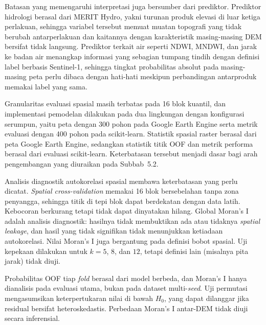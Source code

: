 \documentclass[12pt,a4paper]{article}
\newcommand{\FloatBarrier}{\clearpage}
\begin{document}
\enlargethispage{\baselineskip}Batasan yang memengaruhi interpretasi juga bersumber dari prediktor. Prediktor
hidrologi berasal dari MERIT Hydro, yakni turunan produk elevasi di luar
ketiga perlakuan, sehingga variabel tersebut memuat muatan topografi yang
tidak berubah antarperlakuan dan kaitannya dengan karakteristik masing-masing
DEM bersifat tidak langsung. Prediktor terkait air seperti NDWI, MNDWI, dan
jarak ke badan air menangkap informasi yang sebagian tumpang tindih dengan
definisi label berbasis Sentinel-1, sehingga tingkat probabilitas absolut
pada masing-masing peta perlu dibaca dengan hati-hati meskipun perbandingan
antarproduk memakai label yang sama.

Granularitas evaluasi spasial masih terbatas pada 16 blok kuantil, dan
implementasi pemodelan dilakukan pada dua lingkungan dengan konfigurasi
serumpun, yaitu peta dengan 300 pohon pada Google Earth Engine serta metrik
evaluasi dengan 400 pohon pada scikit-learn. Statistik spasial raster
berasal dari peta Google Earth Engine, sedangkan statistik titik OOF dan
metrik performa berasal dari evaluasi scikit-learn. Keterbatasan tersebut
menjadi dasar bagi arah pengembangan yang
diuraikan pada Subbab~5.2.

Analisis diagnostik autokorelasi spasial membawa keterbatasan yang
perlu dicatat. \textit{Spatial cross-validation} memakai 16 blok bersebelahan
tanpa zona penyangga, sehingga titik di tepi blok dapat berdekatan dengan
data latih. Kebocoran berkurang tetapi tidak dapat dinyatakan hilang. Global
Moran's I adalah analisis diagnostik: hasilnya tidak membuktikan ada atau
tidaknya \textit{spatial leakage}, dan hasil yang tidak signifikan tidak
menunjukkan ketiadaan autokorelasi. Nilai Moran's I juga bergantung pada
definisi bobot spasial. Uji kepekaan dilakukan untuk $k=5$, $8$, dan $12$,
tetapi definisi lain (misalnya pita jarak) tidak diuji.

Probabilitas OOF tiap \textit{fold} berasal dari model berbeda, dan Moran's I
hanya dianalisis pada evaluasi utama, bukan pada dataset multi-\textit{seed}.
Uji permutasi mengasumsikan keterpertukaran nilai di bawah $H_0$, yang dapat
dilanggar jika residual bersifat heteroskedastis. Perbedaan Moran's I
antar-DEM tidak diuji secara inferensial.

\FloatBarrier

\clearpage

\end{document}

